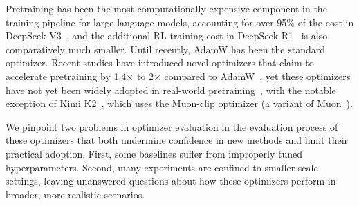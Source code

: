 Pretraining has been the most computationally expensive component in the training pipeline for large language models, accounting for over 95\% of the cost in DeepSeek V3~\cite{deepseekai2025deepseekv3technicalreport}, and the additional RL training cost in DeepSeek R1~\cite{deepseekai2025deepseekr1incentivizingreasoningcapability} is also comparatively much smaller.
Until recently, AdamW has been the standard optimizer. Recent studies have introduced novel optimizers that claim to accelerate pretraining by 1.4$\times$ to 2$\times$ compared to AdamW~\cite{liu2024sophiascalablestochasticsecondorder,vyas2025soapimprovingstabilizingshampoo,liu2025muonscalablellmtraining,yuan2025mars,liang2025cautious,wang2025sharpnessdisparityprincipletransformers,liu2025focusorderconcentratedupdating,pethick2025trainingdeeplearningmodels,ma2025swansgdnormalizationwhitening}, yet these optimizers have not yet been widely adopted in real-world pretraining~\cite{deepseekai2024deepseekllmscalingopensource,yang2025qwen3technicalreport,grattafiori2024llama3herdmodels}, with the notable exception of Kimi K2~\cite{kimiteam2025kimik2openagentic}, which uses the Muon-clip optimizer (a variant of Muon~\cite{jordan2024muon}).


We pinpoint two problems in optimizer evaluation in the evaluation process of these optimizers that both undermine confidence in new methods and limit their practical adoption. First, some baselines suffer from improperly tuned hyperparameters. Second, many experiments are confined to smaller-scale settings, leaving unanswered questions about how these optimizers perform in broader, more realistic scenarios. 



